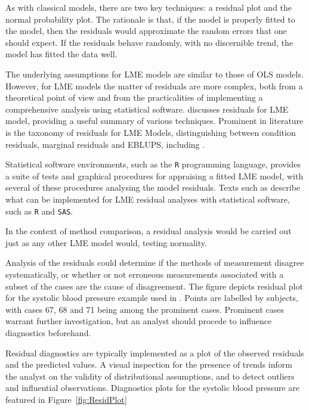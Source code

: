 \documentclass[12pt, a4paper]{report}
\theoremstyle{definition}
\theoremstyle{remark}
\begin{document}
As with classical models, there are two key techniques: a residual plot and the normal probability plot. The rationale is that, if the model is properly fitted to the model, then the residuals would approximate the random errors that one should expect. If the residuals behave randomly, with no discernible trend, the model has fitted the data well. 

The underlying assumptions for LME models are similar to those of OLS models. However, for LME models the matter of residuals are more complex, both from a theoretical point of view and from the practicalities of implementing a comprehensive analysis using statistical software. \citet{schabenberger} discusses residuals for LME model, providing a useful summary of various techniques. Prominent in literature is the taxonomy of residuals for LME Models, distinguishing between condition residuals, marginal residuals and EBLUPS, including \citet{hilden1995, schabenberger, west, NobreSinger2007}.  

Statistical software environments, such as the \texttt{R} programming language, provides a suite of tests and graphical procedures for appraising a fitted LME model, with several of these procedures analysing the model residuals. Texts such as \citet{PB,west,Galecki} describe what can be implemented for LME residual analyses with statistical software, such as \texttt{R} and \texttt{SAS}.

In the context of method comparison, a residual analysis would be carried out just as any other LME model would, testing normality. 

Analysis of the residuals could determine if the methods of measurement disagree systematically, or whether or not erroneous measurements associated with a subset of the cases are the cause of disagreement. 
The figure depicts residual plot for the systolic blood pressure example used in \citet{BA99}. Points are labelled by subjects, with cases 67, 68 and 71 being among the prominent cases. Prominent cases warrant further investigation, but an analyst should procede to influence diagnostics beforehand.

Residual diagnostics are typically implemented as a plot of the observed residuals and the predicted values. A visual inspection for the presence of trends inform the analyst on the validity of distributional assumptions, and to detect outliers and influential observations. Diagnostics plots for the systolic blood pressure are featured in Figure~\ref{fig:ResidPlot}
	
\end{document}
